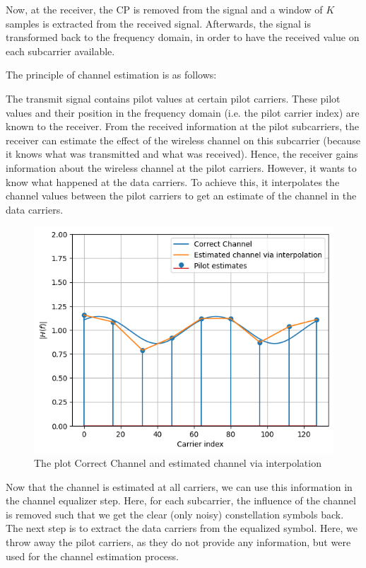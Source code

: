 Now, at the receiver, the CP is removed from the signal and a window of $K$ samples is extracted from the received signal. Afterwards, the signal is transformed back to the frequency domain, in order to have the received value on each subcarrier available.

The principle of channel estimation is as follows:

The transmit signal contains pilot values at certain pilot carriers. These pilot values and their position in the frequency domain (i.e. the pilot carrier index) are known to the receiver. From the received information at the pilot subcarriers, the receiver can estimate the effect of the wireless channel on this subcarrier (because it knows what was transmitted and what was received). Hence, the receiver gains information about the wireless channel at the pilot carriers. However, it wants to know what happened at the data carriers. To achieve this, it interpolates the channel values between the pilot carriers to get an estimate of the channel in the data carriers.

\begin{figure}[htbp]
    \centering
    \includegraphics[width=\linewidth]{../Source/results/channel_estimation}
    \caption{The plot Correct Channel and estimated channel via interpolation}
    \label{channel_estimation}
\end{figure}

Now that the channel is estimated at all carriers, we can use this information in the channel equalizer step. Here, for each subcarrier, the influence of the channel is removed such that we get the clear (only noisy) constellation symbols back. The next step is to extract the data carriers from the equalized symbol. Here, we throw away the pilot carriers, as they do not provide any information, but were used for the channel estimation process.

